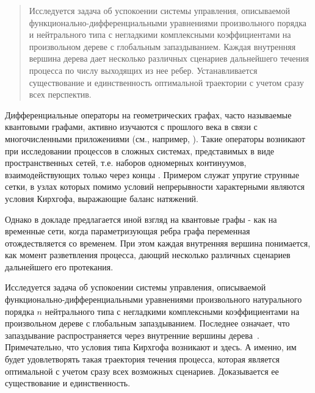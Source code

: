 \maketitle

\begin{abstract}
Исследуется задача об успокоении системы управления, описываемой функ\-цио\-наль\-но-диф\-ференциальными уравнениями произвольного порядка и
нейтрального типа с негладкими комплексными коэффициентами на произвольном дереве с глобальным запаздыванием. Каждая внутренняя вершина
дерева дает несколько различных сценариев дальнейшего течения процесса по числу выходящих из нее ребер. Устанавливается существование и
единственность оптимальной траектории с учетом сразу всех перспектив.

\end{abstract}


Дифференциальные операторы на геометрических графах, часто называемые квантовыми графами, активно изучаются с прошлого века в связи с
многочисленными приложениями (см., например, \cite{Pokornyi,Berkolaiko,Buterin-23}). Такие операторы возникают при исследовании процессов в
сложных системах, представимых в виде пространственных сетей, т.е. наборов одномерных континуумов, взаимодействующих только через концы
\cite{Pokornyi}. Примером служат упругие струнные сетки, в узлах которых помимо условий непрерывности характерными являются условия Кирхгофа,
выражающие баланс натяжений.

Однако в докладе предлагается иной взгляд на квантовые графы - как на временные сети, когда параметризующая ребра графа переменная
отождествляется со временем. При этом каждая внутренняя вершина понимается, как момент разветвления процесса, дающий несколько различных
сценариев дальнейшего его протекания.

Исследуется задача об успокоении системы управления, описываемой функционально-дифференциальными уравнениями произвольного натурального
порядка $n$ нейтрального типа с негладкими комплексными коэффициентами на произвольном дереве с глобальным запаздыванием. Последнее означает,
что запаздывание распространяется через внутренние вершины дерева~\cite{Buterin-23}. Примечательно, что условия типа Кирхгофа возникают и
здесь. А именно, им будет удовлетворять такая траектория течения процесса, которая является оптимальной с учетом сразу всех возможных
сценариев. Доказывается ее существование и единственность.

